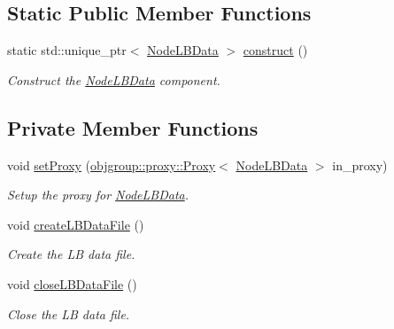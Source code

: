 \subsection*{Static Public Member Functions}
\begin{DoxyCompactItemize}
\item 
static std\+::unique\+\_\+ptr$<$ \hyperlink{structvt_1_1vrt_1_1collection_1_1balance_1_1_node_l_b_data}{Node\+L\+B\+Data} $>$ \hyperlink{structvt_1_1vrt_1_1collection_1_1balance_1_1_node_l_b_data_a8c75ad477772cebf032e7c3664d2e62c}{construct} ()
\begin{DoxyCompactList}\small\item\em Construct the \hyperlink{structvt_1_1vrt_1_1collection_1_1balance_1_1_node_l_b_data}{Node\+L\+B\+Data} component. \end{DoxyCompactList}\end{DoxyCompactItemize}
\subsection*{Private Member Functions}
\begin{DoxyCompactItemize}
\item 
void \hyperlink{structvt_1_1vrt_1_1collection_1_1balance_1_1_node_l_b_data_aaa93321a91e51b7785bedb1e97786bfa}{set\+Proxy} (\hyperlink{structvt_1_1objgroup_1_1proxy_1_1_proxy}{objgroup\+::proxy\+::\+Proxy}$<$ \hyperlink{structvt_1_1vrt_1_1collection_1_1balance_1_1_node_l_b_data}{Node\+L\+B\+Data} $>$ in\+\_\+proxy)
\begin{DoxyCompactList}\small\item\em Setup the proxy for {\ttfamily \hyperlink{structvt_1_1vrt_1_1collection_1_1balance_1_1_node_l_b_data}{Node\+L\+B\+Data}}. \end{DoxyCompactList}\item 
void \hyperlink{structvt_1_1vrt_1_1collection_1_1balance_1_1_node_l_b_data_a90da580e29fec7ae6dad22b071fd5db3}{create\+L\+B\+Data\+File} ()
\begin{DoxyCompactList}\small\item\em Create the LB data file. \end{DoxyCompactList}\item 
void \hyperlink{structvt_1_1vrt_1_1collection_1_1balance_1_1_node_l_b_data_ae966be24ee1338594860af5de92d3e12}{close\+L\+B\+Data\+File} ()
\begin{DoxyCompactList}\small\item\em Close the LB data file. \end{DoxyCompactList}\end{DoxyCompactItemize}
